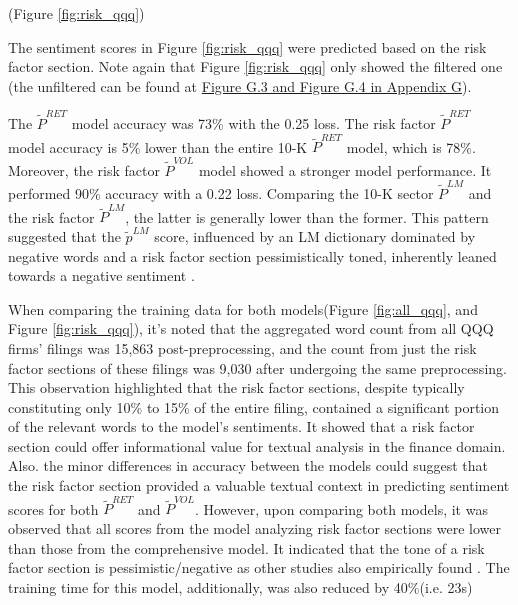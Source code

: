 \documentclass[logo,bsc,singlespacing,parskip]{infthesis}
\begin{document}



 (Figure \ref{fig:risk_qqq})

The sentiment scores in Figure \ref{fig:risk_qqq} were predicted based on the risk factor section. Note again that Figure \ref{fig:risk_qqq} only showed the filtered one (the unfiltered can be found at \hyperref[appendix_risk_qqq]{Figure G.3 and Figure G.4 in Appendix G}). 

The $\tilde{P}^{RET}$ model accuracy was 73\% with the 0.25  loss. The risk factor $\tilde{P}^{RET}$ model accuracy is 5\% lower than the entire 10-K  $\tilde{P}^{RET}$ model, which is 78\%. Moreover, the risk factor $\tilde{P}^{VOL}$ model showed a stronger model performance. It performed 90\% accuracy with a 0.22 loss. Comparing the 10-K sector $\tilde{P}^{LM}$ and the risk factor $\tilde{P}^{LM}$, the latter is generally lower than the former.  This pattern suggested that the $\tilde{p}^{LM}$ score, influenced by an LM dictionary dominated by negative words and a risk factor section pessimistically toned, inherently leaned towards a negative sentiment \cite{campbelletal2014a, Filzen2015}.

When comparing the training data for both models(Figure \ref{fig:all_qqq}, and Figure \ref{fig:risk_qqq}), it's noted that the aggregated word count from all QQQ firms' filings was 15,863 post-preprocessing, and the count from just the risk factor sections of these filings was 9,030 after undergoing the same preprocessing. This observation highlighted that the risk factor sections, despite typically constituting only 10\% to 15\% of the entire filing, contained a significant portion of the relevant words to the model's sentiments. It showed that a risk factor section could offer informational value for textual analysis in the finance domain. Also. the minor differences in accuracy between the models could suggest that the risk factor section provided a valuable textual context in predicting sentiment scores for both $\tilde{P}^{RET}$ and $\tilde{P}^{VOL}$. However, upon comparing both models, it was observed that all scores from the model analyzing risk factor sections were lower than those from the comprehensive model. It indicated that the tone of a risk factor section is pessimistic/negative as other studies also empirically found \cite{campbelletal2014a, Filzen2015}. The training time for this model, additionally, was also reduced by 40\%(i.e. 23s)
\end{document}
